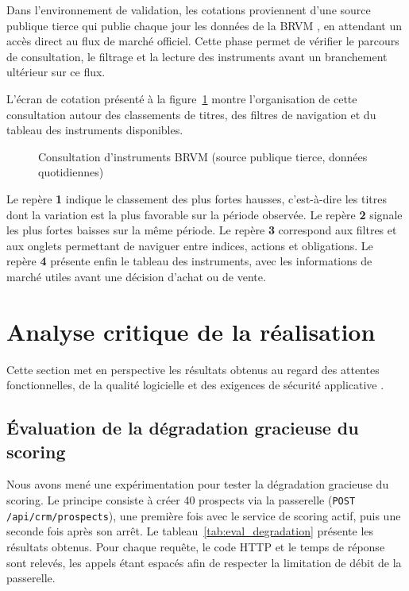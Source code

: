 Dans l'environnement de validation, les cotations proviennent d'une source
publique tierce \cite{brvm_data_public} qui publie chaque jour les données de la
BRVM \cite{brvm_actions}, en attendant un accès direct au flux de marché
officiel. Cette phase permet de vérifier le parcours de consultation, le
filtrage et la lecture des instruments avant un branchement ultérieur sur ce
flux.

L'écran de cotation présenté à la figure~\ref{fig:cotations_brvm} montre
l'organisation de cette consultation autour des classements de titres, des
filtres de navigation et du tableau des instruments disponibles.

\begin{figure}[H]
    \centering
    \caption{Consultation d'instruments BRVM (source publique tierce, données quotidiennes)}
    \label{fig:cotations_brvm}
\end{figure}

\noindent
Le repère \textbf{1} indique le classement des plus fortes hausses, c'est-à-dire
les titres dont la variation est la plus favorable sur la période observée. Le
repère \textbf{2} signale les plus fortes baisses sur la même période. Le repère
\textbf{3} correspond aux filtres et aux onglets permettant de naviguer entre
indices, actions et obligations. Le repère \textbf{4} présente enfin le tableau
des instruments, avec les informations de marché utiles avant une décision
d'achat ou de vente.


\section{Analyse critique de la réalisation}

Cette section met en perspective les résultats obtenus au regard des attentes
fonctionnelles, de la qualité logicielle \cite{iso25010} et des exigences de
sécurité applicative \cite{owasp_asvs}.

\subsection{Évaluation de la dégradation gracieuse du scoring}

Nous avons mené une expérimentation pour tester la dégradation gracieuse du
scoring. Le principe consiste à créer 40 prospects via la passerelle
(\texttt{POST /api/crm/prospects}), une première fois avec le service de scoring
actif, puis une seconde fois après son arrêt. Le tableau~\ref{tab:eval_degradation}
présente les résultats obtenus. Pour chaque requête, le code HTTP et le temps de
réponse sont relevés, les appels étant espacés afin de respecter la limitation
de débit de la passerelle.

